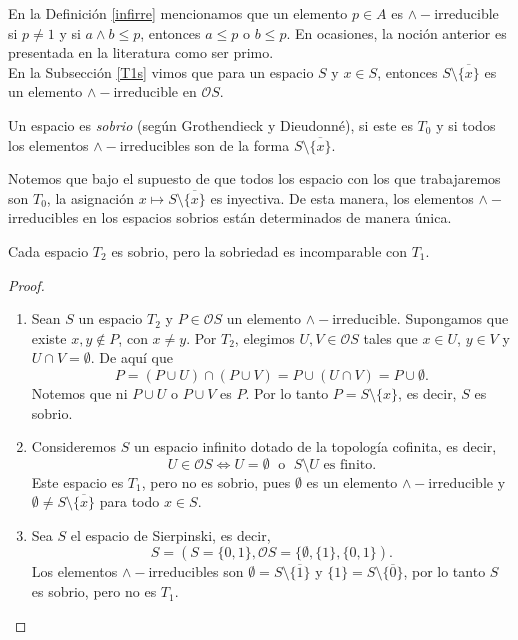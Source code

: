 En la Definición \ref{infirre} mencionamos que un elemento $p\in A$ es $\wedge-$irreducible si $p\neq 1$ y si $a\wedge b\leq p$, entonces $a\leq p$ o $b\leq p$. En ocasiones, la noción anterior es presentada en la literatura como ser primo.\\

En la Subsección \ref{T1s} vimos que para un espacio $S$ y $x\in S$, entonces $S\setminus \overline{\{x\}}$ es un elemento $\wedge-$irreducible en $\mathcal{O}S$.

\begin{dfn}
    Un espacio es \emph{sobrio} (según Grothendieck y Dieudonné), si este es $T_0$ y si todos los elementos $\wedge-$irreducibles son de la forma $S\setminus \overline{\{x\}}$.
\end{dfn}

Notemos que bajo el supuesto de que todos los espacio con los que trabajaremos son $T_0$, la asignación $x\mapsto S\setminus \overline{\{x\}}$ es inyectiva. De esta manera, los elementos $\wedge-$irreducibles en los espacios sobrios están determinados de manera única.

\begin{prop}
    Cada espacio $T_2$ es sobrio, pero la sobriedad es incomparable con $T_1$.
\end{prop}

\begin{proof}
    \begin{enumerate}[$i)$]
        \item Sean $S$ un espacio $T_2$ y $P\in \mathcal{O}S$ un elemento $\wedge-$irreducible. Supongamos que existe $x, y\notin P$, con $x\neq y$. Por $T_2$, elegimos $U, V\in\mathcal{O}S$ tales que $x\in U$, $y\in V$ y $U\cap V=\emptyset$. De aquí que
        \[
        P=(P\cup U)\cap (P\cup V)=P\cup (U\cap V)=P\cup \emptyset.
        \]
        Notemos que ni $P\cup U$ o $P\cup V$ es $P$. Por lo tanto $P=S\setminus \{x\}$, es decir, $S$ es sobrio.
        \item Consideremos $S$ un espacio infinito dotado de la topología cofinita, es decir, 
        \[
        U\in\mathcal{O}S\Leftrightarrow U=\emptyset\; \mbox{ o }\;S\setminus U \mbox{ es finito}.
        \]
        Este espacio es $T_1$, pero no es sobrio, pues $\emptyset$ es un elemento $\wedge-$irreducible y $\emptyset\neq S\setminus \overline{\{x\}}$ para todo $x\in S$.
        \item Sea $S$ el espacio de Sierpinski, es decir,
        \[
        S=(S=\{0,1\},\mathcal{O}S=\{\emptyset,\{1\},\{0,1\}).
        \]
        Los elementos $\wedge-$irreducibles son $\emptyset=S\setminus\overline{\{1\}}$ y $\{1\}=S\setminus \overline{\{0\}}$, por lo tanto $S$ es sobrio, pero no es $T_1$.
    \end{enumerate}
\end{proof}

